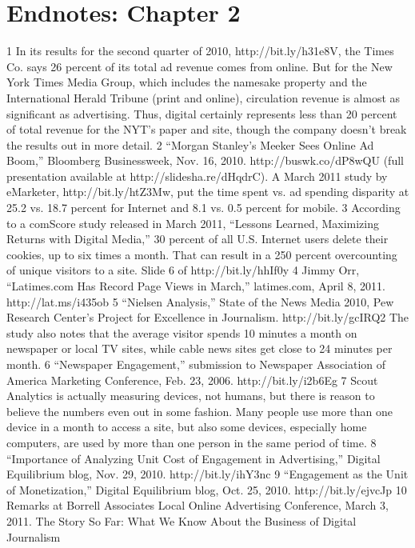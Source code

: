 \section{Endnotes: Chapter 2}
1 In its results for the second quarter of 2010, http://bit.ly/h31e8V, the Times Co. says 26
percent of its total ad revenue comes from online. But for the New York Times Media Group,
which includes the namesake property and the International Herald Tribune (print and
online), circulation revenue is almost as significant as advertising. Thus, digital certainly
represents less than 20 percent of total revenue for the NYT's paper and site, though the
company doesn't break the results out in more detail.
2 ``Morgan Stanley's Meeker Sees Online Ad Boom,'' Bloomberg Businessweek, Nov. 16, 2010.
http://buswk.co/dP8wQU (full presentation available at http://slidesha.re/dHqdrC). A March
2011 study by eMarketer, http://bit.ly/htZ3Mw, put the time spent vs. ad spending disparity
at 25.2 vs. 18.7 percent for Internet and 8.1 vs. 0.5 percent for mobile.
3 According to a comScore study released in March 2011, ``Lessons Learned, Maximizing
Returns with Digital Media,'' 30 percent of all U.S. Internet users delete their cookies, up to
six times a month. That can result in a 250 percent overcounting of unique visitors to a site.
Slide 6 of http://bit.ly/hhIf0y
4 Jimmy Orr, ``Latimes.com Has Record Page Views in March,'' latimes.com, April 8, 2011.
http://lat.ms/i435ob
5 ``Nielsen Analysis,'' State of the News Media 2010, Pew Research Center's Project for
Excellence in Journalism. http://bit.ly/gcIRQ2 The study also notes that the average visitor
spends 10 minutes a month on newspaper or local TV sites, while cable news sites get close
to 24 minutes per month.
6 ``Newspaper Engagement,'' submission to Newspaper Association of America Marketing
Conference, Feb. 23, 2006. http://bit.ly/i2b6Eg
7 Scout Analytics is actually measuring devices, not humans, but there is reason to believe the
numbers even out in some fashion. Many people use more than one device in a month to
access a site, but also some devices, especially home computers, are used by more than one
person in the same period of time.
8 ``Importance of Analyzing Unit Cost of Engagement in Advertising,'' Digital Equilibrium blog,
Nov. 29, 2010. http://bit.ly/ihY3nc
9 ``Engagement as the Unit of Monetization,'' Digital Equilibrium blog, Oct. 25, 2010.
http://bit.ly/ejvcJp
10 Remarks at Borrell Associates Local Online Advertising Conference, March 3, 2011.
The Story So Far: What We Know About the Business of Digital Journalism
